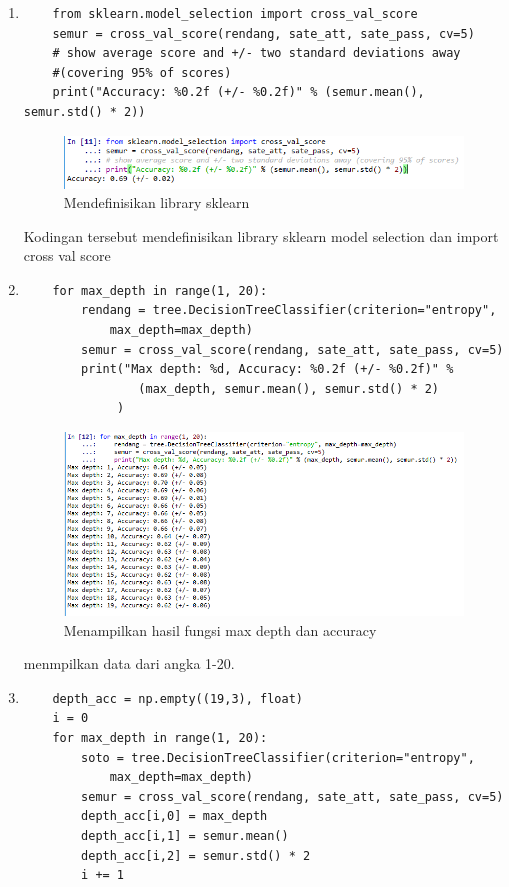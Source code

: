 \begin{enumerate}
\item
\begin{verbatim}
	from sklearn.model_selection import cross_val_score
	semur = cross_val_score(rendang, sate_att, sate_pass, cv=5)
	# show average score and +/- two standard deviations away 
	#(covering 95% of scores)
	print("Accuracy: %0.2f (+/- %0.2f)" % (semur.mean(), semur.std() * 2))
\end{verbatim}
\begin{figure}[ht]
\centering
\includegraphics[scale=0.6]{figures/48.png}
\caption{Mendefinisikan library sklearn}
\end{figure}
\par
	Kodingan tersebut mendefinisikan library sklearn model selection dan import cross val score
\item 
\begin{verbatim}
	for max_depth in range(1, 20):
	    rendang = tree.DecisionTreeClassifier(criterion="entropy", 
			max_depth=max_depth)
	    semur = cross_val_score(rendang, sate_att, sate_pass, cv=5)
	    print("Max depth: %d, Accuracy: %0.2f (+/- %0.2f)" % 
				(max_depth, semur.mean(), semur.std() * 2)
			 )
\end{verbatim}
\begin{figure}[ht]
\centering
\includegraphics[scale=0.6]{figures/49.png}
\caption{Menampilkan hasil fungsi max depth dan accuracy}
\end{figure}
\par
	menmpilkan data dari angka 1-20.

\item
\begin{verbatim}
	depth_acc = np.empty((19,3), float)
	i = 0
	for max_depth in range(1, 20):
	    soto = tree.DecisionTreeClassifier(criterion="entropy", 
			max_depth=max_depth)
	    semur = cross_val_score(rendang, sate_att, sate_pass, cv=5)
	    depth_acc[i,0] = max_depth
	    depth_acc[i,1] = semur.mean()
	    depth_acc[i,2] = semur.std() * 2
	    i += 1


\end{verbatim}
\end{enumerate}
